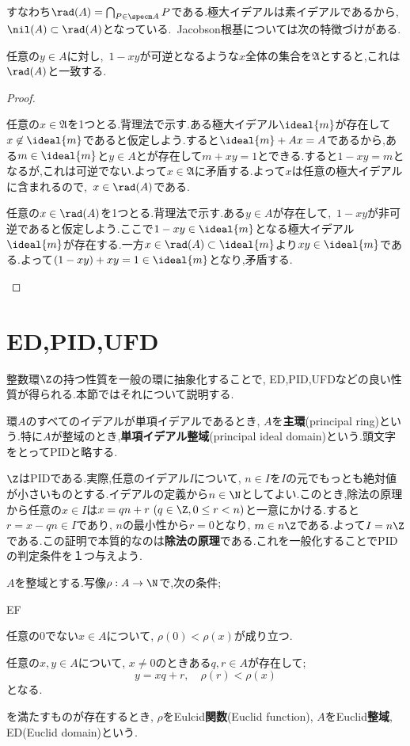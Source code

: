 すなわち$\rad(A)=\bigcap_{P\in\specm A}P$である.極大イデアルは素イデアルであるから,~$\nil(A)\subset\rad(A)$となっている.~Jacobson根基については次の特徴づけがある.
\begin{prop}
	任意の$y\in A$に対し,~$1-xy$が可逆となるような$x$全体の集合を$\mathfrak{A}$とすると,これは$\rad(A)$と一致する.
\end{prop}
\begin{proof}
	\begin{mrkw}
		\item 
		任意の$x\in\mathfrak{A}$を1つとる.背理法で示す.ある極大イデアル$\ideal{m}$が存在して$x\not\in\ideal{m}$であると仮定しよう.すると$\ideal{m}+Ax=A$であるから,ある$m\in\ideal{m}$と$y\in A$とが存在して$m+xy=1$とできる.すると$1-xy=m$となるが,これは可逆でない.よって$x\in\mathfrak{A}$に矛盾する.よって$x$は任意の極大イデアルに含まれるので,~$x\in\rad(A)$である.
		\item 
		任意の$x\in\rad(A)$を1つとる.背理法で示す.ある$y\in A$が存在して,~$1-xy$が非可逆であると仮定しよう.ここで$1-xy\in\ideal{m}$となる極大イデアル$\ideal{m}$が存在する.一方$x\in\rad(A)\subset\ideal{m}$より$xy\in\ideal{m}$である.よって$(1-xy)+xy=1\in\ideal{m}$となり,矛盾する.
	\end{mrkw}
\end{proof}

\section{ED,PID,UFD}
整数環$\Z$の持つ性質を一般の環に抽象化することで, ED,PID,UFDなどの良い性質が得られる.本節ではそれについて説明する.

\begin{defi}[PID]
	環$A$のすべてのイデアルが単項イデアルであるとき, $A$を\textbf{主環}(principal ring)という.特に$A$が整域のとき,\textbf{単項イデアル整域}(principal ideal domain)という.頭文字をとってPIDと略する.
\end{defi}

$\Z$はPIDである.実際,任意のイデアル$I$について, $n\in I$を$I$の元でもっとも絶対値が小さいものとする.イデアルの定義から$n\in\N$としてよい.このとき,除法の原理から任意の$x\in I$は$x=qn+r~(q\in\Z,0\leq r<n)$と一意にかける.すると$r=x-qn\in I$であり, $n$の最小性から$r=0$となり, $m\in n\Z$である.よって$I=n\Z$である.この証明で本質的なのは\textbf{除法の原理}である.これを一般化することでPIDの判定条件を１つ与えよう.

\begin{defi}[Euclid整域]
	$A$を整域とする.写像$\rho:A\to\N$で,次の条件;
	\begin{defiterm}{EF}
		\item 任意の$0$でない$x\in A$について, $\rho(0)<\rho(x)$が成り立つ.
		\item 任意の$x,y\in A$について, $x\neq0$のときある$q,r\in A$が存在して;
		\[y=xq+r,\quad \rho(r)<\rho(x)\]
		となる.
	\end{defiterm}
	を満たすものが存在するとき, $\rho$をEulcid\textbf{関数}(Euclid function), $A$をEuclid\textbf{整域}, ED(Euclid domain)という.
\end{defi}

